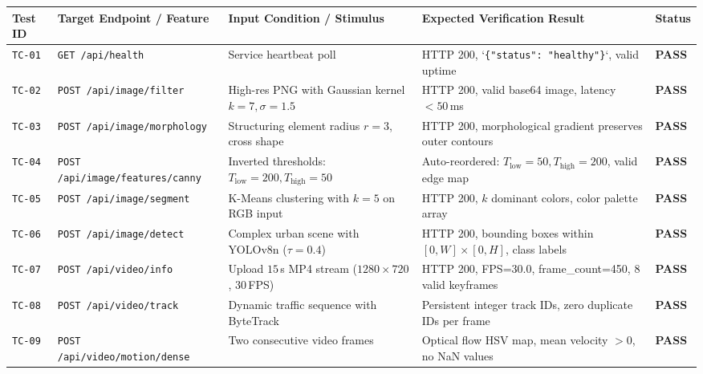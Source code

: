 \begin{table}[htbp]
    \centering
    \small
    \renewcommand{\arraystretch}{1.3}
    \begin{tabularx}{\textwidth}{|p{1.4cm}|p{3.2cm}|p{3.6cm}|p{4.0cm}|p{1.2cm}|}
        \hline
        \textbf{Test ID} & \textbf{Target Endpoint / Feature} & \textbf{Input Condition / Stimulus} & \textbf{Expected Verification Result} & \textbf{Status} \\
        \hline
        \texttt{TC-01} & \texttt{GET /api/health} & Service heartbeat poll & HTTP 200, `\texttt{\{"status": "healthy"\}}`, valid uptime & \textbf{PASS} \\
        \hline
        \texttt{TC-02} & \texttt{POST /api/image/filter} & High-res PNG with Gaussian kernel $k=7, \sigma=1.5$ & HTTP 200, valid base64 image, latency $< 50$\,ms & \textbf{PASS} \\
        \hline
        \texttt{TC-03} & \texttt{POST /api/image/morphology} & Structuring element radius $r=3$, cross shape & HTTP 200, morphological gradient preserves outer contours & \textbf{PASS} \\
        \hline
        \texttt{TC-04} & \texttt{POST /api/image/features/canny} & Inverted thresholds: $T_{\text{low}}=200, T_{\text{high}}=50$ & Auto-reordered: $T_{\text{low}}=50, T_{\text{high}}=200$, valid edge map & \textbf{PASS} \\
        \hline
        \texttt{TC-05} & \texttt{POST /api/image/segment} & K-Means clustering with $k=5$ on RGB input & HTTP 200, $k$ dominant colors, color palette array & \textbf{PASS} \\
        \hline
        \texttt{TC-06} & \texttt{POST /api/image/detect} & Complex urban scene with YOLOv8n ($\tau=0.4$) & HTTP 200, bounding boxes within $[0, W] \times [0, H]$, class labels & \textbf{PASS} \\
        \hline
        \texttt{TC-07} & \texttt{POST /api/video/info} & Upload $15$\,s MP4 stream ($1280\times720$, $30$\,FPS) & HTTP 200, FPS=30.0, frame\_count=450, 8 valid keyframes & \textbf{PASS} \\
        \hline
        \texttt{TC-08} & \texttt{POST /api/video/track} & Dynamic traffic sequence with ByteTrack & Persistent integer track IDs, zero duplicate IDs per frame & \textbf{PASS} \\
        \hline
        \texttt{TC-09} & \texttt{POST /api/video/motion/dense} & Two consecutive video frames & Optical flow HSV map, mean velocity $> 0$, no NaN values & \textbf{PASS} \\

\end{tabularx}
\end{table}
